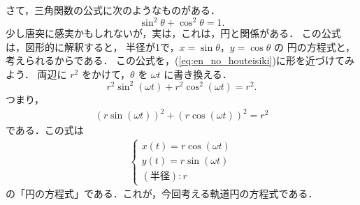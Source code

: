                 さて，三角関数の公式に次のようなものがある．
                    \begin{equation*}
                        \sin^{2}\theta + \cos^{2}\theta = 1.
                    \end{equation*}
                少し唐突に感実かもしれないが，実は，これは，円と関係がある．
                この公式は，図形的に解釈すると，
                半径が1で，$x=\sin\theta$，$y=\cos\theta$ の
                円の方程式と，考えられるからである．
                この公式を，(\ref{eq:en_no_houteisiki})に形を近づけてみよう．
                両辺に $r^{2}$ をかけて，$\theta$ を $\omega t$ に書き換える．
                \begin{equation*}
                    r^{2}\sin^{2}(\omega t) + r^{2}\cos^{2}(\omega t) = r^{2}.
                \end{equation*}
                つまり，
                \begin{align}
                    \left( r\sin( \omega t )\right)^{2} + \left( r\cos( \omega t ) \right)^{2} = r^{2}
                \end{align}
                である．この式は
                    \begin{align}
                        \begin{cases}
                        \displaystyle x(t) = r\cos( \omega t ) \\
                        \displaystyle y(t) = r\sin( \omega t ) \\
                        ( \mbox{半径} ) : r
                        \end{cases}
                    \end{align}
                の「円の方程式」である．これが，今回考える軌道円の方程式である．

